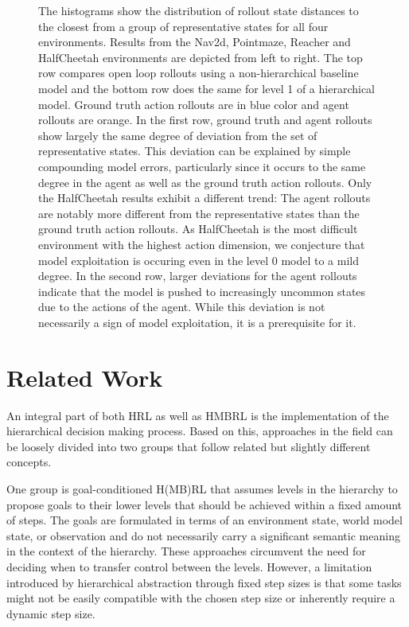 \documentclass{article}
\begin{document}
\begin{figure}[h!]
    \caption{The histograms show the distribution of rollout state distances to the closest from a group of representative states for all four environments. Results from the Nav2d, Pointmaze, Reacher and HalfCheetah environments are depicted from left to right. The top row compares open loop rollouts using a non-hierarchical baseline model and the bottom row does the same for level 1 of a hierarchical model. Ground truth action rollouts are in blue color and agent rollouts are orange. In the first row, ground truth and agent rollouts show largely the same degree of deviation from the set of representative states. This deviation can be explained by simple compounding model errors, particularly since it occurs to the same degree in the agent as well as the ground truth action rollouts. Only the HalfCheetah results exhibit a different trend: The agent rollouts are notably more different from the representative states than the ground truth action rollouts. As HalfCheetah is the most difficult environment with the highest action dimension, we conjecture that model exploitation is occuring even in the level 0 model to a mild degree. In the second row, larger deviations for the agent rollouts indicate that the model is pushed to increasingly uncommon states due to the actions of the agent. While this deviation is not necessarily a sign of model exploitation, it is a prerequisite for it.}
    \label{fig:model_exploitation_histograms}
\end{figure}

\section{Related Work}

An integral part of both HRL as well as HMBRL is the implementation of the hierarchical decision making process. Based on this, approaches in the field can be loosely divided into two groups that follow related but slightly different concepts.

One group is goal-conditioned H(MB)RL that assumes levels in the hierarchy to propose goals to their lower levels that should be achieved within a fixed amount of steps. The goals are formulated in terms of an environment state, world model state, or observation and do not necessarily carry a significant semantic meaning in the context of the hierarchy. These approaches circumvent the need for deciding when to transfer control between the levels. However, a limitation introduced by hierarchical abstraction through fixed step sizes is that some tasks might not be easily compatible with the chosen step size or inherently require a dynamic step size.
\end{document}
